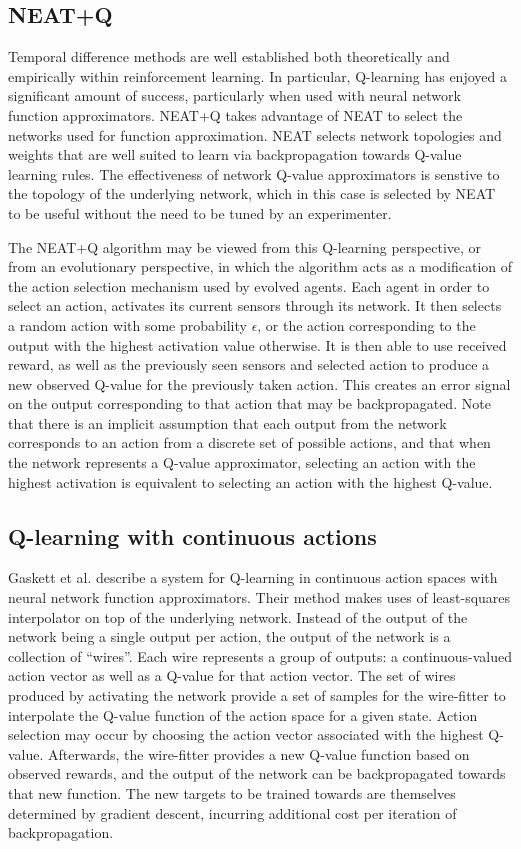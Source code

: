 \documentclass[letterpaper]{article}
\begin{document}
\subsection{NEAT+Q}
Temporal difference methods are well established both theoretically and empirically within reinforcement learning. In particular, Q-learning has enjoyed a significant amount of success, particularly when used with neural network function approximators. NEAT+Q takes advantage of NEAT to select the networks used for function approximation. NEAT selects network topologies and weights that are well suited to learn via backpropagation towards Q-value learning rules. The effectiveness of network Q-value approximators is senstive to the topology of the underlying network, which in this case is selected by NEAT to be useful without the need to be tuned by an experimenter. 

The NEAT+Q algorithm may be viewed from this Q-learning perspective, or from an evolutionary perspective, in which the algorithm acts as a modification of the action selection mechanism used by evolved agents. Each agent in order to select an action, activates its current sensors through its network. It then selects a random action with some probability $\epsilon$, or the action corresponding to the output with the highest activation value otherwise. It is then able to use received reward, as well as the previously seen sensors and selected action to produce a new observed Q-value for the previously taken action. This creates an error signal on the output corresponding to that action that may be backpropagated. Note that there is an implicit assumption that each output from the network corresponds to an action from a discrete set of possible actions, and that when the network represents a Q-value approximator, selecting an action with the highest activation is equivalent to selecting an action with the highest Q-value.

\subsection{Q-learning with continuous actions}
Gaskett et al. describe a system for Q-learning in continuous action spaces with neural network function approximators. Their method makes uses of least-squares interpolator on top of the underlying network. Instead of the output of the network being a single output per action, the output of the network is a collection of ``wires''. Each wire represents a group of outputs: a continuous-valued action vector as well as a Q-value for that action vector. The set of wires produced by activating the network provide a set of samples for the wire-fitter to interpolate the Q-value function of the action space for a given state. Action selection may occur by choosing the action vector associated with the highest Q-value. Afterwards, the wire-fitter provides a new Q-value function based on observed rewards, and the output of the network can be backpropagated towards that new function. The new targets to be trained towards are themselves determined by gradient descent, incurring additional cost per iteration of backpropagation.
\end{document}
